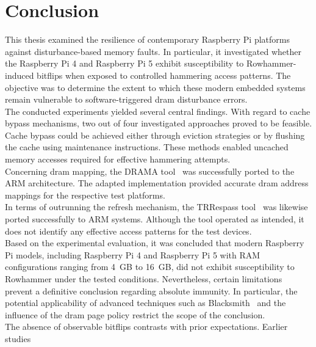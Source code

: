 \clearpage
\section{Conclusion} \label{sec:conclusion}
  This thesis examined the resilience of contemporary Raspberry Pi platforms against 
  disturbance-based memory faults. In particular, it investigated whether the Raspberry 
  Pi 4 and Raspberry Pi 5 exhibit susceptibility to Rowhammer-induced bitflips when 
  exposed to controlled hammering access patterns. The objective was to determine the 
  extent to which these modern embedded systems remain vulnerable to software-triggered 
  \gls{dram} disturbance errors.
  \\
  The conducted experiments yielded several central findings. With regard to cache 
  bypass mechanisms, two out of four investigated approaches proved to be feasible. 
  Cache bypass could be achieved either through eviction strategies or by flushing 
  the cache using maintenance instructions. These methods enabled uncached memory 
  accesses required for effective hammering attempts.
  \\
  Concerning \gls{dram} mapping, the DRAMA tool~\cite{toolDrama} was successfully ported to 
  the ARM architecture. The adapted implementation provided accurate \gls{dram} address 
  mappings for the respective test platforms.
  \\
  In terms of outrunning the refresh mechanism, the TRRespass tool~\cite{toolTRRespass} 
  was likewise ported successfully to ARM systems. Although the tool operated as intended, 
  it does not identify any effective access patterns for the test devices.
  \\
  Based on the experimental evaluation, it was concluded that modern Raspberry Pi 
  models, including Raspberry Pi 4 and Raspberry Pi 5 with RAM configurations ranging 
  from 4~GB to 16~GB, did not exhibit susceptibility to Rowhammer under the tested 
  conditions. Nevertheless, certain limitations prevent a definitive conclusion regarding 
  absolute immunity. In particular, the potential applicability of advanced 
  techniques such as Blacksmith~\cite{toolBlacksmith} and the influence of the \gls{dram} page 
  policy restrict the scope of the conclusion.
  \\
  The absence of observable bitflips contrasts with prior expectations. Earlier studies 
